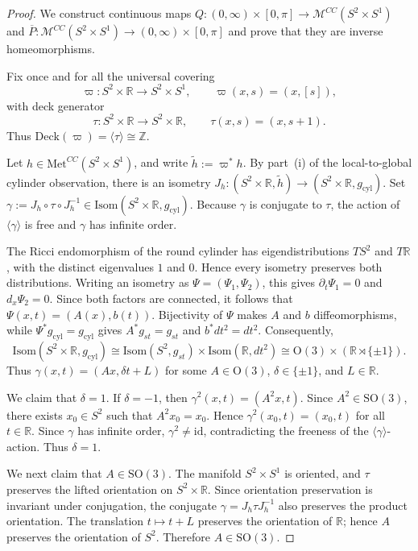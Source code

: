 \documentclass[12pt,oneside,a4paper]{article}
\theoremstyle{mytheorem}
\theoremstyle{remark}
\theoremstyle{definition}
\begin{document}
\begin{proof}
We construct continuous maps
\(Q\colon(0,\infty)\times[0,\pi]\to  \mathcal{M}^{CC}(S^2\times S^1)\)
and
\(\overline P\colon\mathcal{M}^{CC}(S^2\times S^1)\to (0,\infty)\times[0,\pi]\)
and prove that they are inverse homeomorphisms.

Fix once and for all the universal covering
\[
\varpi\colon S^2\times \mathbb R\longrightarrow S^2\times S^1,
\qquad
\varpi(x,s)=(x,[s]),
\]
with deck generator
\[
\tau\colon S^2\times \mathbb R\longrightarrow S^2\times \mathbb R,
\qquad
\tau(x,s)=(x,s+1).
\]
Thus \(\mathrm{Deck}(\varpi)=\langle \tau\rangle\cong \mathbb Z\).

Let \(h\in \mathrm{Met}^{CC}(S^2\times S^1)\), and write
$\widetilde h:=\varpi^*h$. By part~(i) of the local-to-global cylinder
observation, there is an isometry
\(J_h\colon(S^2\times\mathbb R,\widetilde h)
\to (S^2\times\mathbb R,g_{\mathrm{cyl}})\).
Set
\(\gamma:=J_h\circ\tau\circ J_h^{-1}
\in\mathrm{Isom}(S^2\times\mathbb R,g_{\mathrm{cyl}})\).
Because \(\gamma\) is conjugate to \(\tau\), the action of \(\langle\gamma\rangle\) is free and \(\gamma\) has infinite order.

The Ricci endomorphism of the round cylinder has eigendistributions $TS^2$
and $T\mathbb R$, with the distinct eigenvalues $1$ and $0$. Hence every
isometry preserves both distributions. Writing an isometry as
$\Psi=(\Psi_1,\Psi_2)$, this gives $\partial_t\Psi_1=0$ and
$d_x\Psi_2=0$. Since both factors are connected, it follows that
$\Psi(x,t)=(A(x),b(t))$. Bijectivity of $\Psi$ makes $A$ and $b$
diffeomorphisms, while $\Psi^*g_{\mathrm{cyl}}=g_{\mathrm{cyl}}$ gives
$A^*g_{st}=g_{st}$ and $b^*dt^2=dt^2$. Consequently,
\[
\mathrm{Isom}(S^2\times \mathbb R, g_{\mathrm{cyl}})
\cong \mathrm{Isom}(S^2, g_{st}) \times \mathrm{Isom}(\mathbb{R}, dt^2)
\cong \mathrm{O}(3) \times (\mathbb{R} \rtimes \{\pm 1\}).
\]
Thus
\(
\gamma(x,t)=(Ax,\delta t+L)
\)
for some $A\in\mathrm{O}(3)$, $\delta\in\{\pm1\}$, and $L\in\mathbb R$.


We claim that \(\delta=1\). If \(\delta=-1\), then
$\gamma^2(x,t)=(A^2x,t)$.
Since \(A^2\in \mathrm{SO}(3)\), there exists \(x_0\in S^2\) such that
\(A^2x_0=x_0\). Hence $\gamma^2(x_0,t)=(x_0,t)$ for all $t\in\mathbb R$.
Since \(\gamma\) has infinite order, \(\gamma^2\neq\mathrm{id}\), contradicting
the freeness of the \(\langle\gamma\rangle\)-action. Thus \(\delta=1\).

We next claim that \(A\in \mathrm{SO}(3)\). The manifold
\(S^2\times S^1\) is oriented, and \(\tau\) preserves the lifted orientation
on \(S^2\times\mathbb R\). Since orientation preservation is invariant under
conjugation, the conjugate $\gamma=J_h\tau J_h^{-1}$ also preserves the product orientation.
The translation \(t\mapsto t+L\) preserves the orientation of $\mathbb R$;
hence $A$ preserves the orientation of $S^2$. Therefore
$A\in\mathrm{SO}(3)$.


\end{proof}
\end{document}
